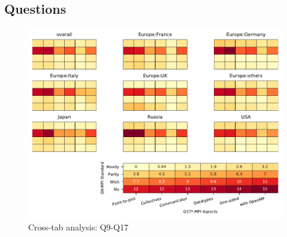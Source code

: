 
\subsection{Questions}


\begin{figure}
\begin{center}
\includegraphics[width=12cm]{../pdfs/Q9-Q17.pdf}
\caption{Cross-tab analysis: Q9-Q17}
\label{fig:Q9-Q17}
\end{center}
\end{figure}
